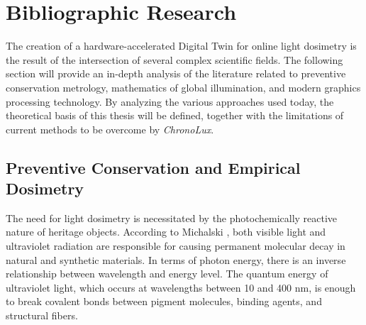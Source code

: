 \chapter{Bibliographic Research}\label{ch:studiubib}
\pagestyle{fancy}

The creation of a hardware-accelerated Digital Twin for online light dosimetry is the result of the intersection of several complex scientific fields. The following section will provide an in-depth analysis of the literature related to preventive conservation metrology, mathematics of global illumination, and modern graphics processing technology. By analyzing the various approaches used today, the theoretical basis of this thesis will be defined, together with the limitations of current methods to be overcome by \textit{ChronoLux}.

\section{Preventive Conservation and Empirical Dosimetry}

The need for light dosimetry is necessitated by the photochemically reactive nature of heritage objects. According to Michalski \cite{michalski1987damage}, both visible light and ultraviolet radiation are responsible for causing permanent molecular decay in natural and synthetic materials. In terms of photon energy, there is an inverse relationship between wavelength and energy level. The quantum energy of ultraviolet light, which occurs at wavelengths between 10 and 400 nm, is enough to break covalent bonds between pigment molecules, binding agents, and structural fibers.

